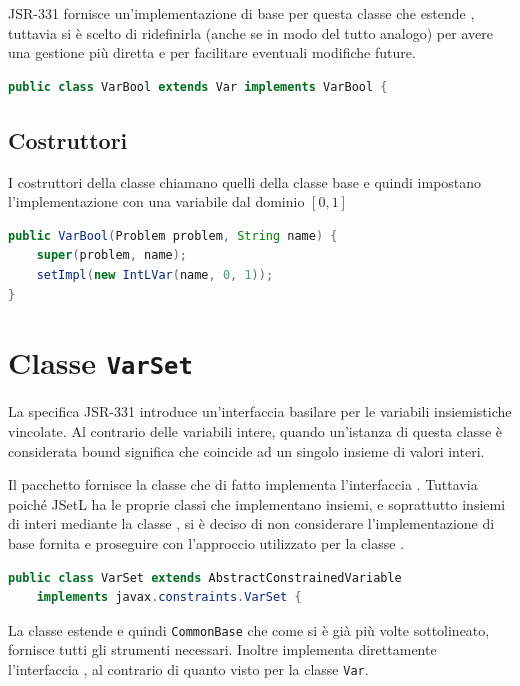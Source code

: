 JSR-331 fornisce un'implementazione di base per questa classe che estende
, tuttavia si è scelto di ridefinirla (anche se in modo del tutto
analogo) per avere una gestione più diretta e per facilitare eventuali
modifiche future.
\begin{lstlisting}[language = Java, frame = single]
public class VarBool extends Var implements VarBool {
\end{lstlisting}
\subsection{Costruttori}
I costruttori della classe chiamano quelli della classe base
 e quindi impostano l'implementazione con una variabile dal
dominio $[0,1]$
\begin{lstlisting}[language = Java,
                   caption = {un costruttore di \files{VarBool}}]
public VarBool(Problem problem, String name) {
	super(problem, name);
	setImpl(new IntLVar(name, 0, 1));
}
\end{lstlisting}

\section{Classe \texttt{VarSet}}
La specifica JSR-331 introduce un'interfaccia basilare per le variabili
insiemistiche vincolate. Al contrario delle variabili intere, quando un'istanza
 di questa classe è considerata bound  significa che coincide ad un 
singolo insieme di
valori interi.

Il pacchetto  fornisce la classe 
 che di fatto implementa l'interfaccia . 
Tuttavia poiché JSetL ha le proprie classi che implementano insiemi, 
e soprattutto insiemi di interi mediante la classe , si è deciso
di non considerare l'implementazione di base fornita e proseguire con 
l'approccio utilizzato per la classe .
\begin{lstlisting}[language = Java,
                   frame = single]
public class VarSet extends AbstractConstrainedVariable 
    implements javax.constraints.VarSet {
\end{lstlisting}

La classe estende  e quindi 
\texttt{CommonBase}  che come si è già più volte
sottolineato, fornisce tutti gli strumenti necessari. Inoltre 
 implementa direttamente l'interfaccia , al
contrario di quanto visto per la classe \texttt{Var}.


